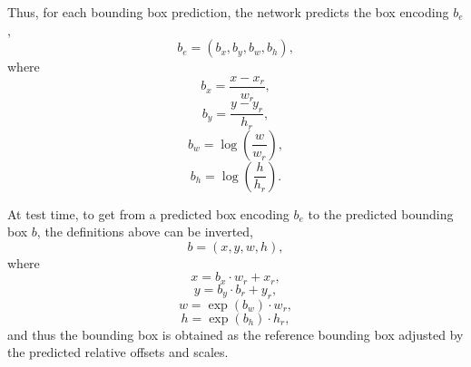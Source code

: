 Thus, for each bounding box prediction, the network predicts the box encoding $b_e$,
\begin{equation}
b_e = (b_x, b_y, b_w, b_h),
\end{equation}
where
\begin{equation*}
b_x = \frac{x - x_r}{w_r},
\end{equation*}
\begin{equation*}
b_y = \frac{y - y_r}{h_r},
\end{equation*}
\begin{equation*}
b_w = \log \left( \frac{w}{w_r} \right),
\end{equation*}
\begin{equation*}
b_h = \log \left( \frac{h}{h_r} \right).
\end{equation*}

At test time, to get from a predicted box encoding $b_e$ to the predicted bounding box $b$,
the definitions above can be inverted,
\begin{equation}
b = (x, y, w, h),
\label{eq:pred_bounding_box}
\end{equation}
where
\begin{equation*}
x = b_x \cdot w_r + x_r,
\end{equation*}
\begin{equation*}
y = b_y \cdot b_r + y_r,
\end{equation*}
\begin{equation*}
w = \exp(b_w) \cdot w_r,
\end{equation*}
\begin{equation*}
h = \exp(b_h) \cdot h_r,
\end{equation*}
and thus the bounding box is obtained as the reference bounding box adjusted by
the predicted relative offsets and scales.

